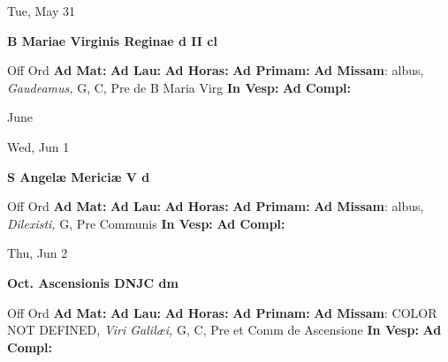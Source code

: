 \documentclass[10pt]{memoir}
\begin{document}
\begin{center}
\begin{minipage}{3.5in}
\vspace{2em}
\begin{center}Tue, May 31
\end{center}
\textbf{ \large B Mariae Virginis Reginae
\textnormal{\normalsize d II cl}}

\begin{justify}Off Ord
\textbf{Ad Mat: }
\textbf{Ad Lau: }
\textbf{Ad Horas: }
\textbf{Ad Primam: }\textbf{Ad Missam}: albus, \textit{Gaudeamus,} G, C, Pre de B Maria Virg
\textbf{In Vesp: }
\textbf{Ad Compl: }
\end{justify}
\end{minipage}
\end{center}

\begin{center}
\pagebreak
\thispagestyle{empty}
{\Huge June}
\end{center}
                    
\begin{center}
\begin{minipage}{3.5in}
\vspace{2em}
\begin{center}Wed, Jun 1
\end{center}
\textbf{ \large S Angelæ Mericiæ V
\textnormal{\normalsize d}}

\begin{justify}Off Ord
\textbf{Ad Mat: }
\textbf{Ad Lau: }
\textbf{Ad Horas: }
\textbf{Ad Primam: }\textbf{Ad Missam}: albus, \textit{Dilexisti,} G, Pre Communis
\textbf{In Vesp: }
\textbf{Ad Compl: }
\end{justify}
\end{minipage}
\end{center}

\begin{center}
\begin{minipage}{3.5in}
\vspace{2em}
\begin{center}Thu, Jun 2
\end{center}
\textbf{ \large Oct. Ascensionis DNJC
\textnormal{\normalsize dm}}

\begin{justify}Off Ord
\textbf{Ad Mat: }
\textbf{Ad Lau: }
\textbf{Ad Horas: }
\textbf{Ad Primam: }\textbf{Ad Missam}: COLOR NOT DEFINED, \textit{Viri Galilæi,} G, C, Pre et Comm de Ascensione
\textbf{In Vesp: }
\textbf{Ad Compl: }
\end{justify}
\end{minipage}
\end{center}
\end{document}
